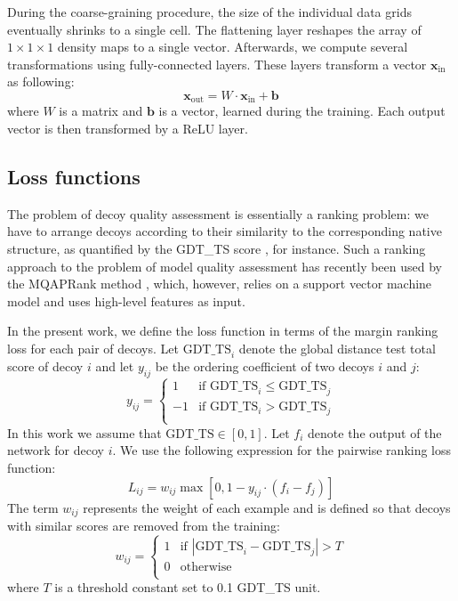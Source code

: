 \documentclass{bioinfo}
\begin{document}
During the coarse-graining procedure, the size of the individual data
grids eventually shrinks to a single cell. The flattening layer
reshapes the array of $1\times 1\times 1$ density maps to a single
vector. Afterwards, we compute several transformations using
fully-connected layers. These layers transform a vector
$\mathbf{x}_\text{in}$ as following:
$$
\mathbf{x}_\text{out} = W \cdot \mathbf{x}_\text{in} + \mathbf{b}
$$
where $W$ is a matrix and $\mathbf{b}$ is a vector, learned during the
training. Each output vector is then transformed by a ReLU layer.


\subsection{Loss functions}
The problem of decoy quality assessment is essentially a ranking
problem: we have to arrange decoys according to their similarity to
the corresponding native structure, as quantified by the GDT\_TS score
\citep{zemla2001casp4}, for instance. Such a ranking approach to the
problem of model quality assessment has recently been used by the
MQAPRank method \citep{jing2016sorting}, which, however, relies on a
support vector machine model and uses high-level features as
input.

In the present work, we define the loss function in terms of the
margin ranking loss \cite{joachims2002optimizing, gong2013deep} for each pair of decoys.
Let $\text{GDT\_TS}_i$ denote the global distance test total score of
decoy $i$ and let $y_{ij}$ be the ordering coefficient of two decoys
$i$ and $j$:
$$
y_{ij} = \begin{cases}
               1& \text{if }\text{GDT\_TS}_i \leq \text{GDT\_TS}_j \\
               -1& \text{if }\text{GDT\_TS}_i > \text{GDT\_TS}_j \\
            \end{cases}
$$
%
In this work we assume that $\text{GDT\_TS}\in [0,1]$.
Let $f_i$ denote the output of the network for decoy $i$. We use the
following expression for the pairwise ranking loss function:
$$
L_{ij} = w_{ij} \max \left[ 0, 1 - y_{ij} \cdot (f_i - f_j) \right]
$$
The term $w_{ij}$ represents the weight of each example and is defined
so that decoys with similar scores are removed from the training:
$$
w_{ij} = \begin{cases}
               1& \text{if } \left| \text{GDT\_TS}_i - \text{GDT\_TS}_j \right| > T \\
               0& \text{otherwise} \\ 
            \end{cases}
$$
where $T$ is a threshold constant set to 0.1 GDT\_TS unit.
\end{document}
